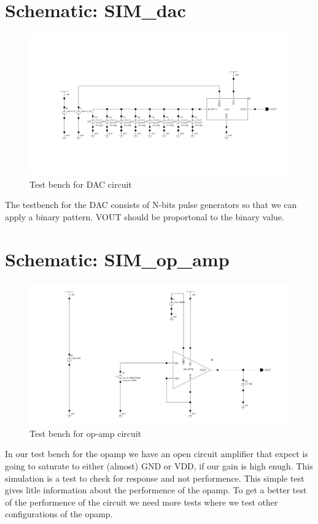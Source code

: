 \documentclass[english, a4paper,11pt]{article}
\begin{document}
\section*{Schematic: SIM\_dac}
\begin{figure}[!ht]
 \centering
   \includegraphics[width=\textwidth]{img/SIM_dac.png}
   \caption{Test bench for DAC circuit}
   \label{sim:dac}
\end{figure}
The testbench for the DAC consists of N-bits pulse generators so that we can apply a binary pattern. 
VOUT should be proportonal to the binary value.

\section*{Schematic: SIM\_op\_amp}
\begin{figure}[!ht]
 \centering
   \includegraphics[width=\textwidth]{img/SIM_op_amp.png}
   \caption{Test bench for op-amp circuit}
   \label{sim:opamp}
\end{figure}
In our test bench for the opamp we have an open circuit amplifier that expect is going to saturate to either (almost) GND or VDD, if our gain is high enugh.
This simulation is a test to check for response and not performence.
This simple test gives litle information about the performence of the opamp. 
To get a better test of the performence of the circuit we need more tests where we test other configurations of the opamp. 


\end{document}
